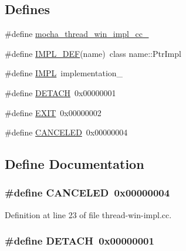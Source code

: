 \subsection*{Defines}
\begin{DoxyCompactItemize}
\item 
\#define \hyperlink{thread-win-impl_8cc_acca0526a60e0a78a4c6af911a5e86bf1}{mocha\_\-thread\_\-win\_\-impl\_\-cc\_\-}
\item 
\#define \hyperlink{thread-win-impl_8cc_a343c21bf5818830fa6070bdb2a06282e}{IMPL\_\-DEF}(name)~class name::PtrImpl
\item 
\#define \hyperlink{thread-win-impl_8cc_a750877e0398a37cb8f03443558fb7f6f}{IMPL}~implementation\_\-
\item 
\#define \hyperlink{thread-win-impl_8cc_a8d08c8624a47f26429c55440f93f0d9d}{DETACH}~0x00000001
\item 
\#define \hyperlink{thread-win-impl_8cc_ad111e603bbebe5d87f6bc39264ce4733}{EXIT}~0x00000002
\item 
\#define \hyperlink{thread-win-impl_8cc_a7ca40bd6cd2ad9603fd8c8e48ad0e5af}{CANCELED}~0x00000004
\end{DoxyCompactItemize}


\subsection{Define Documentation}
\hypertarget{thread-win-impl_8cc_a7ca40bd6cd2ad9603fd8c8e48ad0e5af}{
\subsubsection[{CANCELED}]{\setlength{\rightskip}{0pt plus 5cm}\#define CANCELED~0x00000004}}
\label{thread-win-impl_8cc_a7ca40bd6cd2ad9603fd8c8e48ad0e5af}


Definition at line 23 of file thread-\/win-\/impl.cc.

\hypertarget{thread-win-impl_8cc_a8d08c8624a47f26429c55440f93f0d9d}{
\subsubsection[{DETACH}]{\setlength{\rightskip}{0pt plus 5cm}\#define DETACH~0x00000001}}
\label{thread-win-impl_8cc_a8d08c8624a47f26429c55440f93f0d9d}


